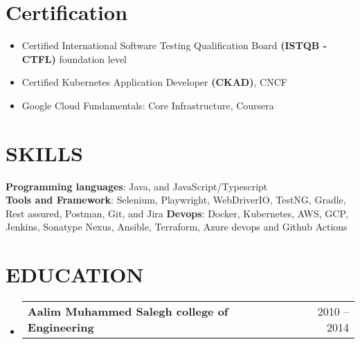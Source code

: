 \documentclass[letterpaper,11pt]{article}
\makeatletter
\newcommand{\resumeItem}[1]{
  \item\small{
    {#1 \vspace{-1pt}}
  }
}
\newcommand{\resumeSubheading}[4]{
  \vspace{-1pt}\item
    \begin{tabular*}{\textwidth}[t]{l@{\extracolsep{\fill}}r}
      \textbf{#1} & {\color{dark-grey}\small #2}\vspace{1pt}\\ %
    \end{tabular*}\vspace{-4pt}
}
\newcommand{\resumeSubHeadingListStart}{\begin{itemize}[leftmargin=0in, label={}]}
\newcommand{\resumeSubHeadingListEnd}{\end{itemize}}
\newcommand{\resumeItemListStart}{\begin{itemize}}
\newcommand{\resumeItemListEnd}{\end{itemize}\vspace{0pt}}
\makeatother
\begin{document}
%
\section{Certification}
  \small
  \resumeItemListStart
    \resumeItem{Certified International Software Testing Qualification Board \textbf{(ISTQB - CTFL)} foundation
    level}
    \resumeItem{Certified Kubernetes Application Developer \textbf{(CKAD)}, CNCF}
    \resumeItem{Google Cloud Fundamentals: Core Infrastructure, Coursera}
  \resumeItemListEnd

%
\section{SKILLS}
 \begin{itemize}[leftmargin=0in, label={}]
    \small{\item{
     \textbf{Programming languages}{: Java, and JavaScript/Typescript} \\
     \textbf{Tools and Framework}{: Selenium, Playwright, WebDriverIO, TestNG, Gradle, Rest assured, Postman, Git, and Jira}
     \textbf{Devops}{: Docker, Kubernetes, AWS, GCP, Jenkins, Sonatype Nexus, Ansible, Terraform, Azure devops and Github Actions}
    }}
 \end{itemize}

\section {EDUCATION}
\resumeSubHeadingListStart
  \resumeSubheading
    {Aalim Muhammed Salegh college of Engineering}{2010 -- 2014}
    {Bachelor of Technology in Information Technology}{}
      
\resumeSubHeadingListEnd

\end{document}
